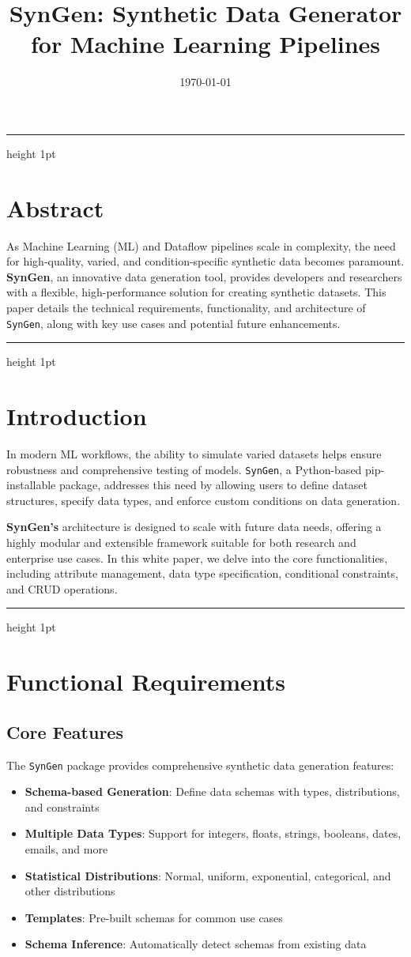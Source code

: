 \documentclass{article}
\title{\Huge \textbf{SynGen: Synthetic Data Generator for Machine Learning Pipelines}}
\author{}
\date{\today}
\newcommand{\horizbar}{
    \vspace{1em}
    \hrule height 1pt
    \vspace{1em}
}
\begin{document}
    \maketitle
    \horizbar

    \section*{Abstract}
    As Machine Learning (ML) and Dataflow pipelines scale in complexity, the need for high-quality, varied, and condition-specific synthetic data becomes paramount. \textbf{SynGen}, an innovative data generation tool, provides developers and researchers with a flexible, high-performance solution for creating synthetic datasets. This paper details the technical requirements, functionality, and architecture of \texttt{SynGen}, along with key use cases and potential future enhancements.

    \horizbar


    \section{Introduction}
    In modern ML workflows, the ability to simulate varied datasets helps ensure robustness and comprehensive testing of models. \texttt{SynGen}, a Python-based pip-installable package, addresses this need by allowing users to define dataset structures, specify data types, and enforce custom conditions on data generation.

    \textbf{SynGen's} architecture is designed to scale with future data needs, offering a highly modular and extensible framework suitable for both research and enterprise use cases. In this white paper, we delve into the core functionalities, including attribute management, data type specification, conditional constraints, and CRUD operations.

    \horizbar


    \section{Functional Requirements}

    \subsection{Core Features}
    The \texttt{SynGen} package provides comprehensive synthetic data generation features:
    \begin{itemize}
        \item \textbf{Schema-based Generation}: Define data schemas with types, distributions, and constraints
        \item \textbf{Multiple Data Types}: Support for integers, floats, strings, booleans, dates, emails, and more
        \item \textbf{Statistical Distributions}: Normal, uniform, exponential, categorical, and other distributions
        \item \textbf{Templates}: Pre-built schemas for common use cases
        \item \textbf{Schema Inference}: Automatically detect schemas from existing data
    \end{itemize}
\end{document}
